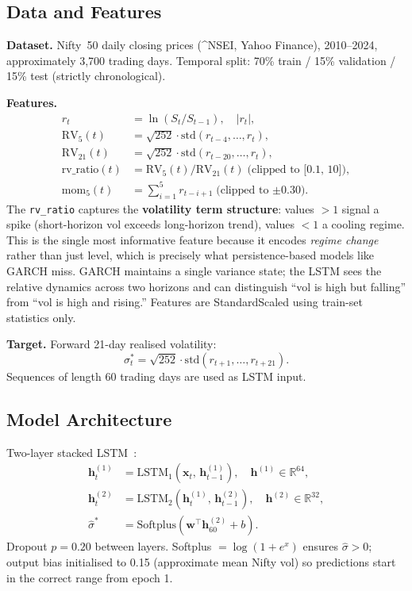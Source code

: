 \documentclass[12pt,a4paper]{article}
\begin{document}
\subsection{Data and Features}

\textbf{Dataset.} Nifty~50 daily closing prices (\^{}NSEI, Yahoo Finance),
2010--2024, approximately 3,700 trading days.  Temporal split:
70\% train / 15\% validation / 15\% test (strictly chronological).

\textbf{Features.}
\begin{align}
  r_t &= \ln(S_t/S_{t-1}), \quad |r_t|,\label{eq:feat_ret}\\
  \mathrm{RV}_5(t)   &= \sqrt{252}\cdot\mathrm{std}(r_{t-4},\ldots,r_t),\\
  \mathrm{RV}_{21}(t) &= \sqrt{252}\cdot\mathrm{std}(r_{t-20},\ldots,r_t),\\
  \mathrm{rv\_ratio}(t) &= \mathrm{RV}_5(t)/\mathrm{RV}_{21}(t)
    \;\text{(clipped to [0.1, 10])},\\
  \mathrm{mom}_5(t) &= \sum_{i=1}^5 r_{t-i+1}
    \;\text{(clipped to $\pm0.30$)}.
\end{align}
The \texttt{rv\_ratio} captures the \textbf{volatility term structure}: values
$>1$ signal a spike (short-horizon vol exceeds long-horizon trend), values $<1$
a cooling regime.  This is the single most informative feature because
it encodes \emph{regime change} rather than just level, which is precisely what
persistence-based models like GARCH miss.  GARCH maintains a single variance
state; the LSTM sees the relative dynamics across two horizons and can
distinguish ``vol is high but falling'' from ``vol is high and rising.''
Features are StandardScaled using train-set statistics only.

\textbf{Target.} Forward 21-day realised volatility:
\begin{equation}
  \sigma^*_t = \sqrt{252}\cdot\mathrm{std}(r_{t+1},\ldots,r_{t+21}).
  \label{eq:target}
\end{equation}
Sequences of length 60 trading days are used as LSTM input.

\subsection{Model Architecture}

Two-layer stacked LSTM~\citep{Hochreiter1997}:
\begin{align}
  \mathbf{h}^{(1)}_t &= \mathrm{LSTM}_1(\mathbf{x}_t,\,\mathbf{h}^{(1)}_{t-1}),
    \quad \mathbf{h}^{(1)}\in\mathbb{R}^{64},\\
  \mathbf{h}^{(2)}_t &= \mathrm{LSTM}_2(\mathbf{h}^{(1)}_t,\,\mathbf{h}^{(2)}_{t-1}),
    \quad \mathbf{h}^{(2)}\in\mathbb{R}^{32},\\
  \hat{\sigma}^*     &= \mathrm{Softplus}(\mathbf{w}^\top\mathbf{h}^{(2)}_{60}+b).
\end{align}
Dropout $p=0.20$ between layers.  Softplus $= \log(1+e^x)$ ensures
$\hat\sigma>0$; output bias initialised to 0.15 (approximate mean Nifty vol)
so predictions start in the correct range from epoch 1.
\end{document}
